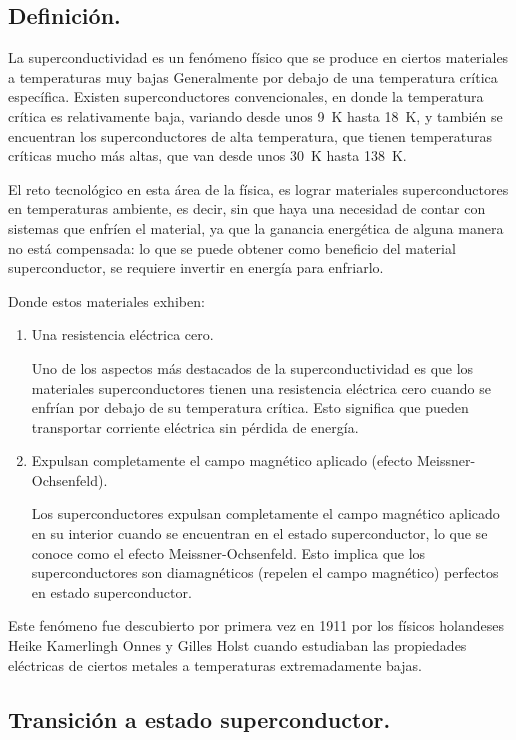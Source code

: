 \documentclass[12pt]{article}
\begin{document}
\subsection{Definición.}

La superconductividad es un fenómeno físico que se produce en ciertos materiales a temperaturas muy bajas Generalmente por debajo de una temperatura crítica específica. Existen superconductores convencionales, en donde la temperatura crítica es relativamente baja, variando desde unos \SI{9}{\kelvin} hasta \SI{18}{\kelvin}, y también se encuentran los superconductores de alta temperatura, que tienen temperaturas críticas mucho más altas, que van desde unos \SI{30}{\kelvin} hasta \SI{138}{\kelvin}.

El reto tecnológico en esta área de la física, es lograr materiales superconductores en temperaturas ambiente, es decir, sin que haya una necesidad de contar con sistemas que enfríen el material, ya que la ganancia energética de alguna manera no está compensada: lo que se puede obtener como beneficio del material superconductor, se requiere invertir en energía para enfriarlo.

Donde estos materiales exhiben:
\begin{enumerate}
\item Una resistencia eléctrica cero.

Uno de los aspectos más destacados de la superconductividad es que los materiales superconductores tienen una resistencia eléctrica cero cuando se enfrían por debajo de su temperatura crítica. Esto significa que pueden transportar corriente eléctrica sin pérdida de energía.
\item Expulsan completamente el campo magnético aplicado (efecto Meissner-Ochsenfeld).

Los superconductores expulsan completamente el campo magnético aplicado en su interior cuando se encuentran en el estado superconductor, lo que se conoce como el efecto Meissner-Ochsenfeld. Esto implica que los superconductores son diamagnéticos (repelen el campo magnético) perfectos en estado superconductor.
\end{enumerate}

Este fenómeno fue descubierto por primera vez en 1911 por los físicos holandeses Heike Kamerlingh Onnes y Gilles Holst cuando estudiaban las propiedades eléctricas de ciertos metales a temperaturas extremadamente bajas.

\subsection{Transición a estado superconductor.}
\end{document}

